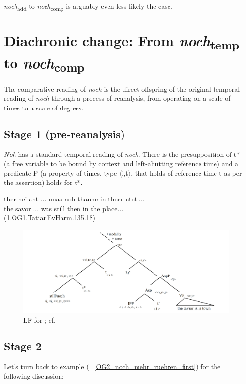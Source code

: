 \documentclass[output=paper]{langsci/langscibook}
\begin{document}
\textit{noch}\textsubscript{add} to \textit{noch}\textsubscript{comp} is arguably even less likely the case.



\section{Diachronic change: From \textit{noch}\textsubscript{temp} to \textit{noch}\textsubscript{comp}}\label{sec_diachr_analysis}

The comparative reading of \textit{noch} is the direct offspring of the original temporal reading of \textit{noch} through a process of reanalysis, from operating on a scale of times to a scale of degrees.

\subsection{Stage 1 (pre-reanalysis)} \textit{Noh} has a standard temporal reading of \textit{noch}. There is the presupposition of t* (a free variable to be bound by context and left-abutting reference time) and a predicate P (a property of times, type $\langle$i,t$\rangle$, that holds of reference time t as per the assertion) holds for t*.

\ea\gll ther heilant ... uuas noh thanne in theru steti...\\
       the savor ... was still then in the place...\\
 \hfill (1.OG1.TatianEvHarm.135.18)\label{TEMP_jesus_noch_in_town}
\z

\begin{figure}
\includegraphics[width=1\textwidth]{figures/LF0_temp}
\caption{LF for ; cf. \citep{beck2016a_sub}}
\label{fig:LF_TEMP_jesus_noch_in_town}
\end{figure}

\subsection{Stage 2} Let's turn back to example  (=\ref{OG2_noch_mehr_ruehren_first}) for the following discussion:
\end{document}
